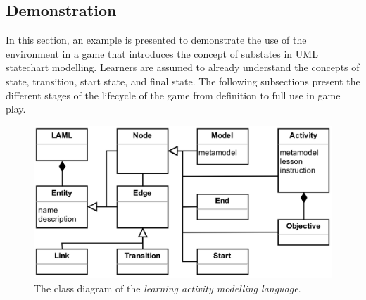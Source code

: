 \documentclass[12pt, a4paper]{report} \usepackage[titletoc]{appendix}
\begin{document}
\subsection{Demonstration}
In this section, an example is presented to demonstrate the use of the environment in a game that introduces the concept of substates in UML statechart modelling. Learners are assumed to already understand the concepts of state, transition, start state, and final state. The following subsections present the different stages of the lifecycle of the game from definition to full use in game play.

\begin{figure}[t!]
\centering
\includegraphics[width=12cm]{laml}
\caption{The class diagram of the \emph{learning activity modelling language}.}
\label{laml}
\end{figure}
\end{document}
